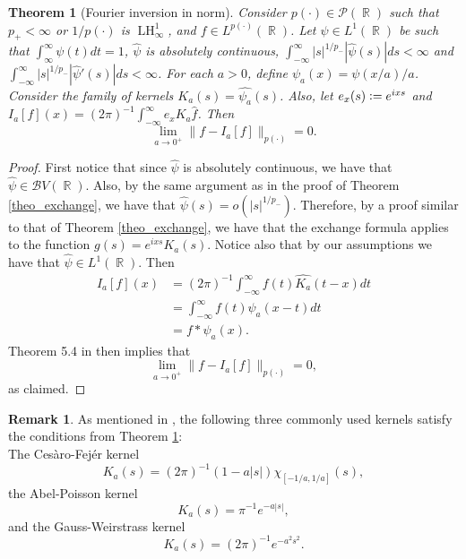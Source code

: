 \documentclass[11pt,reqno]{amsart}
\newtheorem{theorem}{Theorem}[section]
\theoremstyle{definition}
\theoremstyle{definition}
\newtheorem{obs}{Remark}
\theoremstyle{definition}
\DeclareMathOperator{\R}{\mathbb{R}}
\newcommand{\p}{p(\cdot)}
\newcommand{\Lp}{L^{\p}(\R)}
\newcommand{\BV}{\mathcal{B}V}
\newcommand{\defeq}{\vcentcolon=}
\newcommand{\LH}{\operatorname{LH}_\infty^1}
\begin{document}
\begin{theorem}[Fourier inversion in norm]\label{theo_inversion}
     Consider $\p\in\mathcal{P}(\R)$ such that $p_{+}<\infty$ or $1/\p$ is $\LH$, and $f\in \Lp$. Let $\psi\in L^1(\R)$ be such that $\int_{\infty}^\infty\psi(t)dt=1$, $\widehat{\psi}$ is absolutely continuous, $\int_{-\infty}^\infty|s|^{1/p_{-}}|\widehat{\psi}(s)|ds<\infty$ and $\int_{-\infty}^\infty|s|^{1/p_{-}}|\widehat{\psi}'(s)|ds<\infty$. For each $a>0$, define $\psi_a(x)=\psi(x/a)/a$. Consider the family of kernels $K_a(s)=\widehat{\psi_a}(s)$. Also, let $e_x(s)\defeq e^{ixs}$ and $I_a[f](x)=(2\pi)^{-1}\int_{-\infty}^\infty e_x K_a\widehat{f}$. Then 
    \begin{equation*}
        \lim_{a\to 0^{+}}\|f-I_a[f]\|_{\p}=0.
    \end{equation*}
\end{theorem}
\begin{proof}
    First notice that since $\widehat{\psi}$ is absolutely continuous, we have that $\widehat{\psi}\in\BV(\R)$. Also, by the same argument as in the proof of Theorem \ref{theo_exchange}, we have that $\widehat{\psi}(s)=o(|s|^{1/p_{-}})$. Therefore, by a proof similar to that of Theorem \ref{theo_exchange}, we have that the exchange formula applies to the function $g(s)= e^{ixs}K_a(s)$. Notice also that by our assumptions we have that $\widehat{\psi}\in L^1(\R)$.  Then 
    \begin{align*}
        I_a[f](x)&=(2\pi)^{-1}\int_{-\infty}^{\infty}f(t)\widehat{K_a}(t-x)dt\\
        &=\int_{-\infty}^{\infty}f(t)\psi_a(x-t)dt\\
        &=f*\psi_a(x).
    \end{align*}
    Theorem 5.4 in \cite{Cruz-Uribe} then implies that 
    \begin{equation*}
        \lim_{a\to 0^+}\|f-I_a[f]\|_{\p}=0,
    \end{equation*}
    as claimed.
\end{proof}
\begin{obs}
    As mentioned in \cite{Talvila2025}, the following three commonly used kernels satisfy the conditions from Theorem \ref{theo_inversion}:\\
    The Cesàro-Fejér kernel
    \begin{equation*}
        K_a(s)=(2\pi)^{-1}(1-a|s|)\chi_{[-1/a,1/a]}(s),
    \end{equation*}
    the Abel-Poisson kernel
    \begin{equation*}
        K_a(s)=\pi^{-1}e^{-a|s|},
    \end{equation*}
    and the Gauss-Weirstrass kernel
    \begin{equation*}
        K_a(s)=(2\pi)^{-1}e^{-a^2s^2}.
    \end{equation*}
\end{obs}
\end{document}
